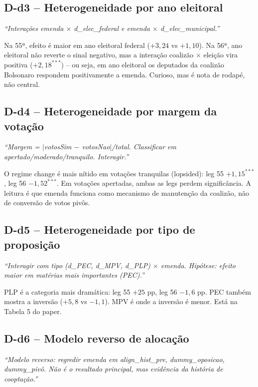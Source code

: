 \documentclass[11pt,a4paper]{article}
\newcommand{\pedido}[1]{\par\medskip\noindent\textit{\textcolor{quotegray}{#1}}\par\smallskip}
\begin{document}
\subsection*{D-d3 -- Heterogeneidade por ano eleitoral}

\pedido{``Interações emenda $\times$ d\_elec\_federal e emenda $\times$ d\_elec\_municipal.''}

Na 55ª, efeito é maior em ano eleitoral federal ($+3{,}24$ vs $+1{,}10$). Na 56ª, ano eleitoral não reverte o sinal negativo, mas a interação coalizão $\times$ eleição vira positiva ($+2{,}18^{***}$) -- ou seja, em ano eleitoral os deputados da coalizão Bolsonaro respondem positivamente a emenda. Curioso, mas é nota de rodapé, não central.

\subsection*{D-d4 -- Heterogeneidade por margem da votação}

\pedido{``Margem = $|$votosSim $-$ votosNao$|$/total. Classificar em apertado/moderado/tranquilo. Interagir.''}

O regime change é mais nítido em votações tranquilas (lopsided): leg 55 $+1{,}15^{***}$, leg 56 $-1{,}52^{***}$. Em votações apertadas, ambas as legs perdem significância. A leitura é que emenda funciona como mecanismo de manutenção da coalizão, não de conversão de votos pivôs.

\subsection*{D-d5 -- Heterogeneidade por tipo de proposição}

\pedido{``Interagir com tipo (d\_PEC, d\_MPV, d\_PLP) $\times$ emenda. Hipótese: efeito maior em matérias mais importantes (PEC).''}

PLP é a categoria mais dramática: leg 55 $+25$ pp, leg 56 $-1{,}6$ pp. PEC também mostra a inversão ($+5{,}8$ vs $-1{,}1$). MPV é onde a inversão é menor. Está na Tabela 5 do paper.

\subsection*{D-d6 -- Modelo reverso de alocação}

\pedido{``Modelo reverso: regredir emenda em align\_hist\_pre, dummy\_oposicao, dummy\_pivô. Não é o resultado principal, mas evidência da história de cooptação.''}
\end{document}
